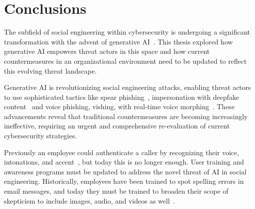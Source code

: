 

\chapter{Conclusions\label{chapter:conclusions}}
\begin{comment}
- Muistuta tutkimuskysymys
- Tärkeimmät tulokset ja perusteet
- Incident costs, numbers = impact
suositukset
- Anakyysia, vertailua, arviointia
- Ei turhia osioita, toistoa
- Puutteita kandissa? Mitä olisi hyvä vielä kertoa?’
- phishing by far the most loss causing cyberattack (fbi)
- calls to verified phone numbers (fbi), not relying on phone numbers on emails
- out of 880,418 fbi 298,878 were phishing 2023 (individuals, not organizations)
- more than half of organizations said they are passing the costs to customers ibm
- cybersecurity teams are constantly understaffed ibm
\end{comment}

The subfield of social engineering within cybersecurity is undergoing a significant transformation with the advent of generative AI~\citep{fakhouri_AI_Driven_Solutions_SE_Attacks_2024}. This thesis explored how generative AI empowers threat actors in this space and how current countermeasures in an organizational environment need to be updated to reflect this evolving threat landscape.

Generative AI is revolutionizing social engineering attacks, enabling threat actors to use sophisticated tactics like spear phishing~\citep{basit_Comprehensive_Survey_AI_Phishing_Detection_2021}, impersonation with deepfake content~\citep{mirsky_Creation_Detection_Deepfakes_2021} and voice phishing, vishing, with real-time voice morphing~\citep{doan_BTSE_Audio_Deepfake_Detection_2023}. These advancements reveal that traditional countermeasures are becoming increasingly ineffective, requiring an urgent and comprehensive re-evaluation of current cybersecurity strategies.

Previously an employee could authenticate a caller by recognizing their voice, intonations, and accent~\citep{mitnick_The_Art_of_Deception_2003}, but today this is no longer enough. User training and awareness programs must be updated to address the novel threat of AI in social engineering. Historically, employees have been trained to spot spelling errors in email messages, and today they must be trained to broaden their scope of skepticism to include images, audio, and videos as well~\citep{mirsky_Creation_Detection_Deepfakes_2021}.

